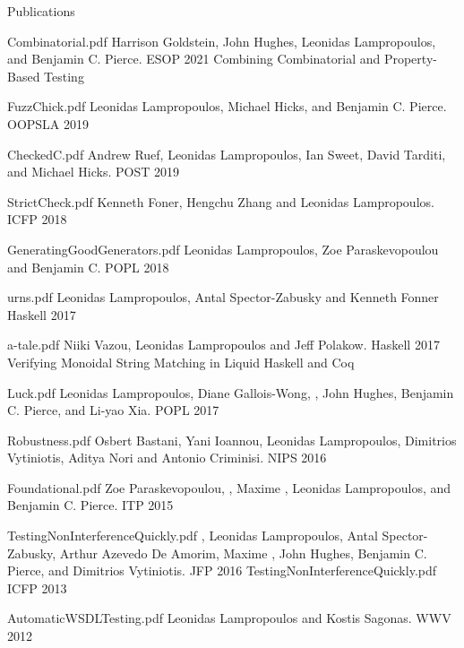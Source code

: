 \documentclass{resume} %
\begin{document}
\begin{rSection}{Publications}

    {Combinatorial.pdf}
    {Harrison Goldstein, John Hughes, Leonidas Lampropoulos, and Benjamin C. Pierce.}
    {ESOP 2021}
    {Combining Combinatorial and Property-Based Testing}    
    
    {FuzzChick.pdf}
    {Leonidas Lampropoulos, Michael Hicks, and Benjamin C. Pierce.}
    {OOPSLA 2019}
    
    {CheckedC.pdf}
    {Andrew Ruef, Leonidas Lampropoulos, Ian Sweet, David Tarditi, and Michael Hicks.}
    {POST 2019}

    {StrictCheck.pdf}
    {Kenneth Foner, Hengchu Zhang and Leonidas Lampropoulos.}
    {ICFP 2018}

    {GeneratingGoodGenerators.pdf}
    {Leonidas Lampropoulos, Zoe Paraskevopoulou and Benjamin C.}
    {POPL 2018}

    {urns.pdf}
    {Leonidas Lampropoulos, Antal Spector-Zabusky and Kenneth Fonner}
    {Haskell 2017}

    {a-tale.pdf}
    {Niiki Vazou, Leonidas Lampropoulos and Jeff Polakow.}
    {Haskell 2017}
    {Verifying Monoidal String Matching in Liquid Haskell and Coq}

    {Luck.pdf}
    {Leonidas Lampropoulos, Diane Gallois-Wong, \Catalin \Hritcu, John Hughes, Benjamin C. Pierce, and Li-yao Xia.}
    {POPL 2017}

    {Robustness.pdf}
    {Osbert Bastani, Yani Ioannou, Leonidas Lampropoulos, Dimitrios Vytiniotis, Aditya Nori and Antonio Criminisi.}
    {NIPS 2016}

    {Foundational.pdf}
    {Zoe Paraskevopoulou, \Catalin \Hritcu, Maxime \Denes, Leonidas Lampropoulos, and Benjamin C. Pierce.}
    {ITP 2015}
    
    {TestingNonInterferenceQuickly.pdf}
    {\Catalin \Hritcu, Leonidas Lampropoulos, Antal Spector-Zabusky, Arthur
    Azevedo De Amorim, Maxime \Denes, John Hughes, Benjamin C. Pierce, and Dimitrios
    Vytiniotis.}
    {JFP 2016}
    {TestingNonInterferenceQuickly.pdf}
    {ICFP 2013}
%

    {AutomaticWSDLTesting.pdf}
    {Leonidas Lampropoulos and Kostis Sagonas.}
    {WWV 2012}
   
\end{rSection}
\end{document}
